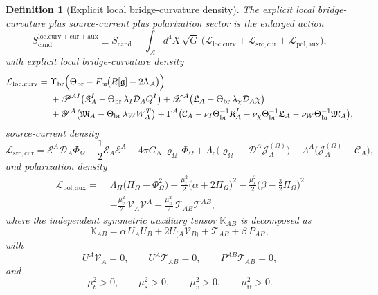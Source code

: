 \documentclass[11pt]{article}
\newcommand{\Sub}{\mathcal{A}}
\newcommand{\BridgeMetric}{\mathfrak g}
\newcommand{\ProjSub}{P}
\newcommand{\SpatialD}{\mathcal D}
\newcommand{\FlowPot}{\Phi_\Omega}
\newcommand{\BalanceField}{\Pi_\Omega}
\newcommand{\BalMult}{\Lambda_\Pi}
\newcommand{\SourceDensity}{\varrho_\Omega}
\newcommand{\SourceCurrent}{\mathcal J^{(\Omega)}}
\newcommand{\ConstCurrent}{\mathcal C}
\newcommand{\ContMult}{\Lambda_{\mathrm c}}
\newcommand{\CurrentMult}{\Lambda}
\newcommand{\ConstGamma}{\Gamma}
\newcommand{\CurvQMult}{\mathscr P}
\newcommand{\CurvChiMult}{\mathscr X}
\newcommand{\CurvTransMult}{\mathscr Y}
\newcommand{\SourceFlux}{\mathcal E}
\newcommand{\AuxPol}{\mathbb K}
\newcommand{\CandAction}{S_{\mathrm{cand}}}
\newcommand{\CurvAction}{S_{\mathrm{cand}}^{\mathrm{loc.curv+cur+aux}}}
\newcommand{\CurvSeed}{\Theta_{\mathrm{br}}}
\newcommand{\CurvSeedMult}{\Upsilon_{\mathrm{br}}}
\newcommand{\CurvProfile}{F_{\mathrm{br}}}
\newcommand{\CurvOneI}{\mathfrak K}
\newcommand{\CurvOneChi}{\mathfrak L}
\newcommand{\CurvOneW}{\mathfrak M}
\newtheorem{definition}{Definition}
\begin{document}
\begin{definition}[Explicit local bridge-curvature density]
\label{def:action}
The \emph{explicit local bridge-curvature plus source-current plus polarization sector} is the enlarged action
\begin{equation}
\CurvAction
\equiv
\CandAction
+
\int_{\Sub} d^4X\,\sqrt{G}\,
\bigl(
\mathcal L_{\mathrm{loc.curv}}
+\mathcal L_{\mathrm{src,cur}}
+\mathcal L_{\mathrm{pol,aux}}
\bigr),
\label{eq:fullaction}
\end{equation}
with explicit local bridge-curvature density
\begin{align}
\mathcal L_{\mathrm{loc.curv}}
=\;&
\CurvSeedMult\Bigl(
\CurvSeed-\CurvProfile\!\bigl(R[\BridgeMetric]-2\Lambda_{\Sub}\bigr)
\Bigr)
\nonumber\\
&+\CurvQMult^{AI}\bigl(\CurvOneI_A^I-\CurvSeed\,\lambda_I\SpatialD_AQ^I\bigr)
+\CurvChiMult^A\bigl(\CurvOneChi_A-\CurvSeed\,\lambda_\chi\SpatialD_A\chi\bigr)
\nonumber\\
&+\CurvTransMult^A\bigl(\CurvOneW_A-\CurvSeed\,\lambda_WW_A^T\bigr)
+\ConstGamma^A\bigl(
\ConstCurrent_A
-\nu_I\CurvSeed^{-1}\CurvOneI_A^I
-\nu_\chi\CurvSeed^{-1}\CurvOneChi_A
-\nu_W\CurvSeed^{-1}\CurvOneW_A
\bigr),
\label{eq:lloccurv}
\end{align}
source-current density
\begin{equation}
\mathcal L_{\mathrm{src,cur}}
=
\SourceFlux^A\SpatialD_A\FlowPot
-\frac12 \SourceFlux_A\SourceFlux^A
-4\pi G_N\,\SourceDensity\,\FlowPot
+\ContMult\bigl(\SourceDensity+\SpatialD^A\SourceCurrent_A\bigr)
+\CurrentMult^A\bigl(\SourceCurrent_A-\ConstCurrent_A\bigr),
\label{eq:lcur}
\end{equation}
and polarization density
\begin{align}
\mathcal L_{\mathrm{pol,aux}}
=\;&
\BalMult\bigl(\BalanceField-\FlowPot^2\bigr)
-\frac{\mu_t^2}{2}\bigl(\alpha+2\BalanceField\bigr)^2
-\frac{\mu_s^2}{2}\bigl(\beta-\tfrac32\BalanceField\bigr)^2
\nonumber\\
&-\frac{\mu_v^2}{2}\,\mathcal V_A\mathcal V^A
-\frac{\mu_{\mathrm{tf}}^2}{2}\,\mathcal T_{AB}\mathcal T^{AB},
\label{eq:laux}
\end{align}
where the independent symmetric auxiliary tensor \(\AuxPol_{AB}\) is decomposed as
\begin{equation}
\AuxPol_{AB}
=
\alpha\,U_AU_B
+2U_{(A}\mathcal V_{B)}
+\mathcal T_{AB}
+\beta\,\ProjSub_{AB},
\label{eq:Kdecomp}
\end{equation}
with
\begin{equation}
U^A\mathcal V_A=0,
\qquad
U^A\mathcal T_{AB}=0,
\qquad
\ProjSub^{AB}\mathcal T_{AB}=0,
\label{eq:TVcond}
\end{equation}
and
\begin{equation}
\mu_t^2>0,
\qquad
\mu_s^2>0,
\qquad
\mu_v^2>0,
\qquad
\mu_{\mathrm{tf}}^2>0.
\label{eq:masses}
\end{equation}
\end{definition}
\end{document}
